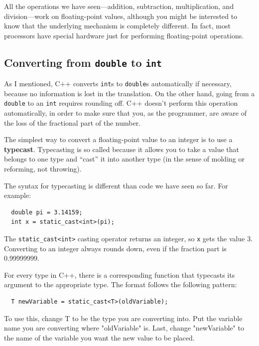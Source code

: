 
All the operations we have seen---addition, subtraction,
multiplication, and division---work on floating-point values,
although you might be interested to know that the underlying mechanism
is completely different.  In fact, most processors have special
hardware just for performing floating-point operations.

\subsection{Converting from {\tt double} to {\tt int}}
\label{rounding}

As I mentioned, C++ converts {\tt int}s
to {\tt double}s automatically if necessary, because no
information is lost in the translation.  On the other hand,
going from a {\tt double} to an {\tt int} requires rounding
off.  C++ doesn't perform this operation automatically, in
order to make sure that you, as the programmer, are aware
of the loss of the fractional part of the number.

The simplest way to convert a floating-point value to an integer is to
use a {\bf typecast}.  Typecasting is so called because it allows you
to take a value that belongs to one type and ``cast'' it into another
type (in the sense of molding or reforming, not throwing).

The syntax for typecasting is different than code we have seen so far.  For example:

\begin{lstlisting}
  double pi = 3.14159;
  int x = static_cast<int>(pi);
\end{lstlisting}
%
The {\tt static\_cast<int>} casting operator returns an integer, so {\tt x} gets the value
3.  Converting to an integer always rounds down, even if the fraction
part is 0.99999999.

For every type in C++, there is a corresponding function that
typecasts its argument to the appropriate type. The format follows the following pattern:

\begin{lstlisting}
  T newVariable = static_cast<T>(oldVariable);
\end{lstlisting}
To use this, change T to be the type you are converting into. Put the variable name you are converting where "oldVariable" is. Last, change "newVariable" to the name of the variable you want the new value to be placed. 

